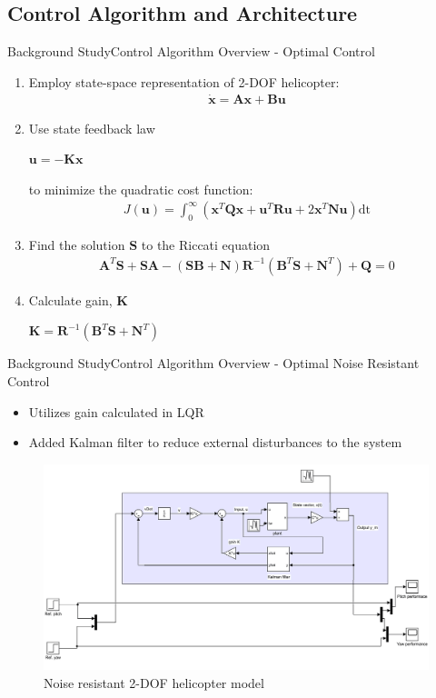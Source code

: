 \documentclass{beamer}
\begin{document}
\subsection{Control Algorithm and Architecture}
\begin{frame}{Background Study}{Control Algorithm Overview - Optimal Control}
\begin{enumerate}
    \item Employ state-space representation of 2-DOF helicopter:
    \begin{align*}
        \dot{\mathbf{x}} = \mathbf{A}\mathbf{x} + \mathbf{B}\mathbf{u}
    \end{align*}
    \item Use state feedback law
    \begin{center}
        $\mathbf{u} = -\mathbf{K}\mathbf{x}$
    \end{center}
    to minimize the quadratic cost function:
    \begin{align*}
        J(\mathbf{u}) = \int_0^\infty (\mathbf{x}^T\mathbf{Q}\mathbf{x} + \mathbf{u}^T\mathbf{R}\mathbf{u} + 2\mathbf{x}^T\mathbf{N}\mathbf{u})\mathrm{dt}
    \end{align*}
    \item Find the solution $\mathbf{S}$ to the Riccati equation
    \begin{align*}
        \mathbf{A}^T\mathbf{S}+\mathbf{SA}-(\mathbf{SB}+\mathbf{N})\mathbf{R}^{-1}(\mathbf{B}^T\mathbf{S}+\mathbf{N}^T)+\mathbf{Q}=0
    \end{align*}    
    \item Calculate gain, $\mathbf{K}$
    \begin{center}
        $\mathbf{K}=\mathbf{R}^{-1}(\mathbf{B}^T\mathbf{S}+\mathbf{N}^T)$
    \end{center}
\end{enumerate}
\end{frame}
\begin{frame}{Background Study}{Control Algorithm Overview - Optimal Noise Resistant Control}
\begin{itemize}
    \item Utilizes gain calculated in LQR
    \item Added Kalman filter to reduce external disturbances to the system
\end{itemize} 
\begin{figure}
    \centering
    \includegraphics[width=.8\textwidth,keepaspectratio=true]{figs/img/LQG_SimulinkResize.png}
    \caption{Noise resistant 2-DOF helicopter model}
    \label{fig:LQGModel}
\end{figure}
\end{frame}
\end{document}
